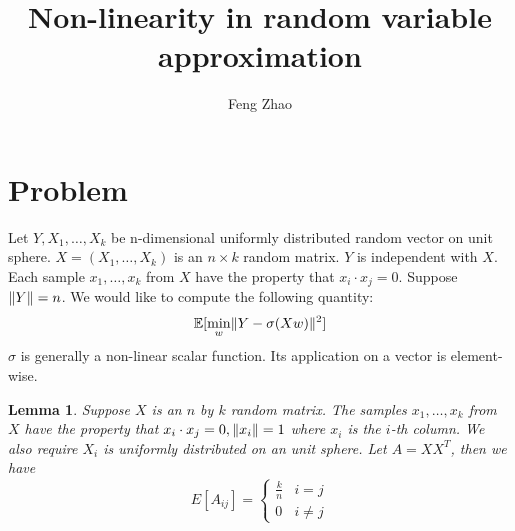\documentclass{article}
\title{Non-linearity in random variable approximation}
\author{Feng Zhao}
\DeclarePairedDelimiter\norm{\lVert}{\rVert}
\def\E{\mathbb{E}}
\newtheorem{lemma}{Lemma}
\begin{document}
\maketitle
\section{Problem}
Let $Y, X_1, \dots, X_k$ be n-dimensional uniformly distributed random vector on unit sphere. $X=(X_1, \dots, X_k)$ is an $n\times k$ random matrix. $Y$ is independent with $X$. Each sample $x_1, \dots, x_k$ from $X$ have the property that $x_i \cdot x_j = 0$. Suppose $\norm{Y}=n$. We would like to compute the following quantity:
\begin{equation}\label{eq:Eminw}
\E[\min_w \norm{Y - \sigma (X w ) }^2]
\end{equation}
$\sigma$ is generally a non-linear scalar function. Its application on a vector is element-wise.
\begin{lemma}\label{lem:uniform}
Suppose $X$ is an $n$ by $k$ random matrix. The samples $x_1, \dots, x_k$ from $X$ have the property that $x_i \cdot x_j = 0, \norm{x_i}=1$ where $x_i$ is the $i$-th column.  We also require $X_i$ is uniformly distributed on an unit sphere. Let $A=X X^T$, then we have
\begin{equation}
E[A_{ij}]= \begin{cases}
\frac{k}{n} & i = j\\
0 & i\neq j 
\end{cases}
\end{equation}
\end{lemma}
\end{document}
